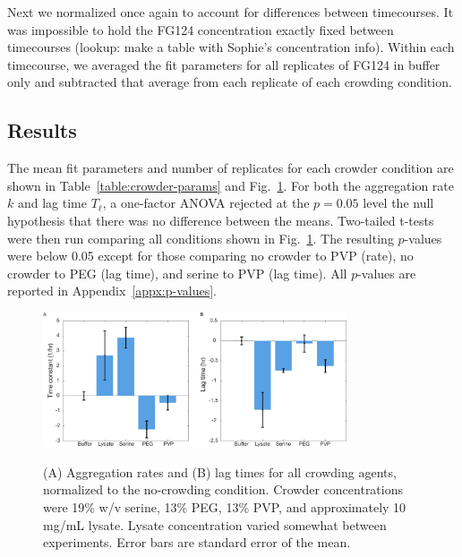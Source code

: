 Next we normalized once again to account for differences between timecourses.  It was impossible to hold the FG124 concentration exactly fixed between timecourses (lookup: make a table with Sophie's concentration info).   Within each timecourse, we averaged the fit parameters for all replicates of FG124 in buffer only and subtracted that average from each replicate of each crowding condition.

\subsection{Results}

The mean fit parameters and number of replicates for each crowder condition are shown in Table~\ref{table:crowder-params} and Fig.~\ref{fig:tht-all-conditions}.  For both the aggregation rate $k$ and lag time $T_\ell$, a one-factor ANOVA rejected at the $p=0.05$ level the null hypothesis that there was no difference between the means.  Two-tailed t-tests were then run comparing all conditions shown in Fig.~\ref{fig:tht-all-conditions}.  The resulting $p$-values were below 0.05 except for those comparing no crowder to PVP (rate), no crowder to PEG (lag time), and serine to PVP (lag time).  All $p$-values are reported in Appendix~\ref{appx:p-values}.


\begin{figure}
\caption[Aggregation rates and lag times for all crowding agents.]{(A) Aggregation rates and (B) lag times for all crowding agents, normalized to the no-crowding condition.  Crowder concentrations were 19\% w/v serine, 13\% PEG, 13\% PVP, and approximately 10 mg/mL lysate.  Lysate concentration varied somewhat between experiments. Error bars are standard error of the mean.}
\centering
\includegraphics[width=0.8\textwidth]{figs/ch05/barCharts.pdf}
\label{fig:tht-all-conditions}
\end{figure}

